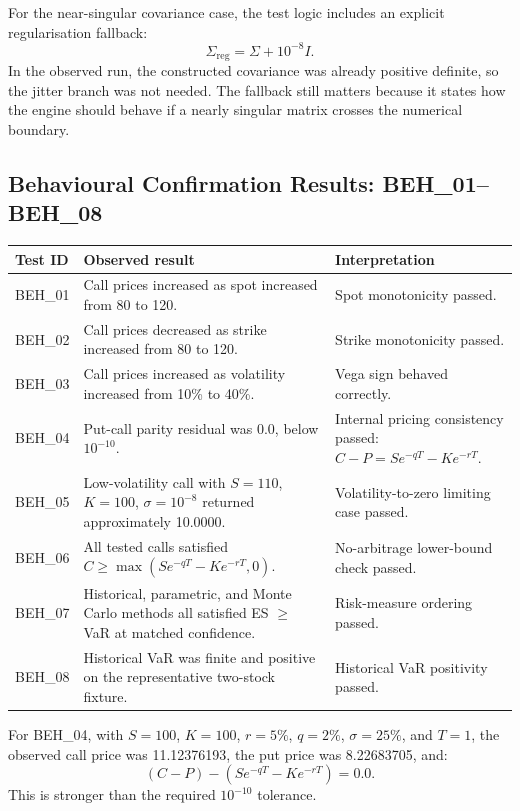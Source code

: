 \documentclass[11pt]{article}
\begin{document}
For the near-singular covariance case, the test logic includes an explicit
regularisation fallback:
\[
  \Sigma_{\mathrm{reg}} = \Sigma + 10^{-8} I.
\]
In the observed run, the constructed covariance was already positive
definite, so the jitter branch was not needed.  The fallback still matters
because it states how the engine should behave if a nearly singular matrix
crosses the numerical boundary.

\subsection{Behavioural Confirmation Results: BEH\_01--BEH\_08}

\begin{center}
\footnotesize
\begin{tabular}{L{1.7cm}L{5.2cm}L{6.2cm}}
\toprule
\textbf{Test ID} & \textbf{Observed result} & \textbf{Interpretation} \\
\midrule
BEH\_01 & Call prices increased as spot increased from 80 to 120. & Spot monotonicity passed. \\
BEH\_02 & Call prices decreased as strike increased from 80 to 120. & Strike monotonicity passed. \\
BEH\_03 & Call prices increased as volatility increased from 10\% to 40\%. & Vega sign behaved correctly. \\
BEH\_04 & Put-call parity residual was $0.0$, below $10^{-10}$. & Internal pricing consistency passed:
$C-P = S e^{-qT} - K e^{-rT}$. \\
BEH\_05 & Low-volatility call with $S=110$, $K=100$, $\sigma=10^{-8}$ returned approximately 10.0000. & Volatility-to-zero limiting case passed. \\
BEH\_06 & All tested calls satisfied $C \geq \max(S e^{-qT} - K e^{-rT},0)$. & No-arbitrage lower-bound check passed. \\
BEH\_07 & Historical, parametric, and Monte Carlo methods all satisfied ES $\geq$ VaR at matched confidence. & Risk-measure ordering passed. \\
BEH\_08 & Historical VaR was finite and positive on the representative two-stock fixture. & Historical VaR positivity passed. \\
\bottomrule
\end{tabular}
\end{center}

For BEH\_04, with $S=100$, $K=100$, $r=5\%$, $q=2\%$, $\sigma=25\%$,
and $T=1$, the observed call price was 11.12376193, the put price was
8.22683705, and:
\[
  (C-P) - (S e^{-qT} - K e^{-rT}) = 0.0.
\]
This is stronger than the required $10^{-10}$ tolerance.
\end{document}

